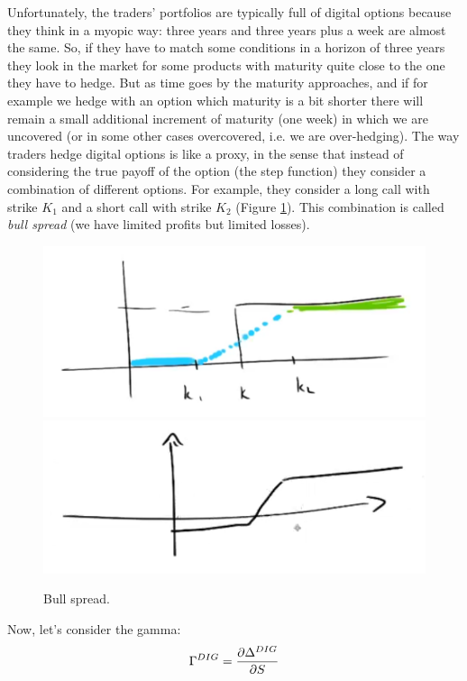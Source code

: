 Unfortunately, the traders' portfolios are typically full of digital options because they think in a myopic way: three years and three years plus a week are almost the same. So, if they have to match some conditions in a horizon of three years they look in the market for some products with maturity quite close to the one they have to hedge. But as time goes by the maturity approaches, and if for example we hedge with an option which maturity is a bit shorter there will remain a small additional increment of maturity (one week) in which we are uncovered (or in some other cases overcovered, i.e. we are over-hedging). The way traders hedge digital options is like a proxy, in the sense that instead of considering the true payoff of the option (the step function) they consider a combination of different options. For example, they consider a long call with strike $K_1$ and a short call with strike $K_2$ (Figure \ref{fig:dighedge}). This combination is called \emph{bull spread} (we have limited profits but limited losses).
\begin{figure}[htp]
    \centering
    \includegraphics[scale=0.3]{fig/tmp/fig26.png}
    \includegraphics[scale=0.3]{fig/tmp/fig27.png}
    \caption{Bull spread.}
    \label{fig:dighedge}
\end{figure}
Now, let's consider the gamma:
\begin{equation}
    \Gamma^{DIG} = \pdv{\Delta^{DIG}}{S} 
\end{equation}
